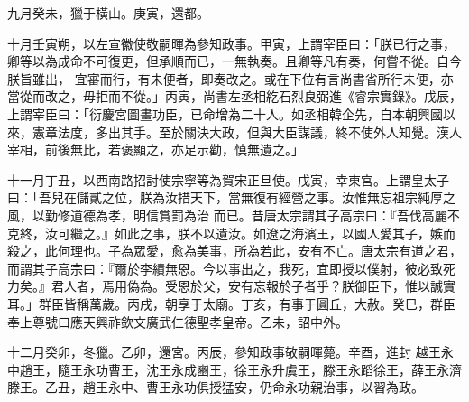 \begin{pinyinscope}
 九月癸未，獵于橫山。庚寅，還都。



 十月壬寅朔，以左宣徽使敬嗣暉為參知政事。甲寅，上謂宰臣曰：「朕已行之事，卿等以為成命不可復更，但承順而已，一無執奏。且卿等凡有奏，何嘗不從。自今朕旨雖出，
 宜審而行，有未便者，即奏改之。或在下位有言尚書省所行未便，亦當從而改之，毋拒而不從。」丙寅，尚書左丞相紇石烈良弼進《睿宗實錄》。戊辰，上謂宰臣曰：「衍慶宮圖畫功臣，已命增為二十人。如丞相韓企先，自本朝興國以來，憲章法度，多出其手。至於關決大政，但與大臣謀議，終不使外人知覺。漢人宰相，前後無比，若褒顯之，亦足示勸，慎無遺之。」



 十一月丁丑，以西南路招討使宗寧等為賀宋正旦使。戊寅，幸東宮。上謂皇太子曰：「吾兒在儲貳之位，朕為汝措天下，當無復有經營之事。汝惟無忘祖宗純厚之風，以勤修道德為孝，明信賞罰為治
 而已。昔唐太宗謂其子高宗曰：『吾伐高麗不克終，汝可繼之。』如此之事，朕不以遺汝。如遼之海濱王，以國人愛其子，嫉而殺之，此何理也。子為眾愛，愈為美事，所為若此，安有不亡。唐太宗有道之君，而謂其子高宗曰：『爾於李績無恩。今以事出之，我死，宜即授以僕射，彼必致死力矣。』君人者，焉用偽為。受恩於父，安有忘報於子者乎？朕御臣下，惟以誠實耳。」群臣皆稱萬歲。丙戌，朝享于太廟。丁亥，有事于圓丘，大赦。癸巳，群臣奉上尊號曰應天興祚欽文廣武仁德聖孝皇帝。乙未，詔中外。



 十二月癸卯，冬獵。乙卯，還宮。丙辰，參知政事敬嗣暉薨。辛酉，進封
 越王永中趙王，隨王永功曹王，沈王永成豳王，徐王永升虞王，滕王永蹈徐王，薛王永濟滕王。乙丑，趙王永中、曹王永功俱授猛安，仍命永功親治事，以習為政。



\end{pinyinscope}